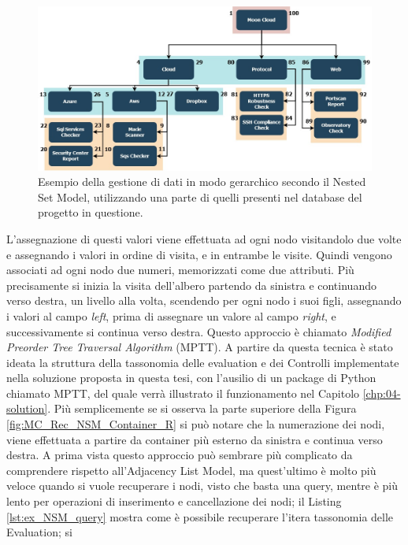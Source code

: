 \begin{figure}[ht!]
    \centering
    \includegraphics[scale=0.57]{images/MC_Rec_NSM_Tree.jpg}
    \caption[Gestione di dati (visione ad albero) secondo il NSM]{Esempio della gestione di dati in modo gerarchico secondo il Nested Set Model, utilizzando una parte di quelli presenti nel database del 
    progetto in questione.}
    \label{fig:MC_Rec_NSM_Tree}
\end{figure}
\hfill\break
L'assegnazione di questi valori viene effettuata ad ogni nodo visitandolo due volte e assegnando i valori in ordine di visita, e in entrambe le visite. 
Quindi vengono associati ad ogni nodo due numeri, memorizzati come due attributi. 
Più precisamente si inizia la visita dell'albero partendo da sinistra e continuando verso destra, un livello alla volta, scendendo per ogni 
nodo i suoi figli, assegnando i valori al campo \textit{left}, prima di assegnare un valore al campo \textit{right}, e successivamente si continua verso 
destra. Questo approccio è chiamato \textit{Modified Preorder Tree Traversal Algorithm} (MPTT). A partire da questa tecnica è stato 
ideata la struttura della tassonomia delle evaluation e dei Controlli implementate nella soluzione proposta in questa tesi, con 
l'ausilio di un package di Python chiamato MPTT, del quale verrà illustrato il funzionamento nel Capitolo \ref{chp:04-solution}.\hfill\break
Più semplicemente se si osserva la parte superiore della Figura \ref{fig:MC_Rec_NSM_Container_R} si può notare che la numerazione dei nodi, viene 
effettuata a partire da container più esterno da sinistra e continua verso destra.\hfill\break
A prima vista questo approccio può sembrare più complicato da comprendere rispetto all'Adjacency List Model, ma quest'ultimo è 
molto più veloce quando si vuole recuperare i nodi, visto che basta una query, mentre è più lento per operazioni di inserimento e 
cancellazione dei nodi; il Listing \ref{lst:ex_NSM_query} mostra come è possibile recuperare l'itera tassonomia delle Evaluation; si 
